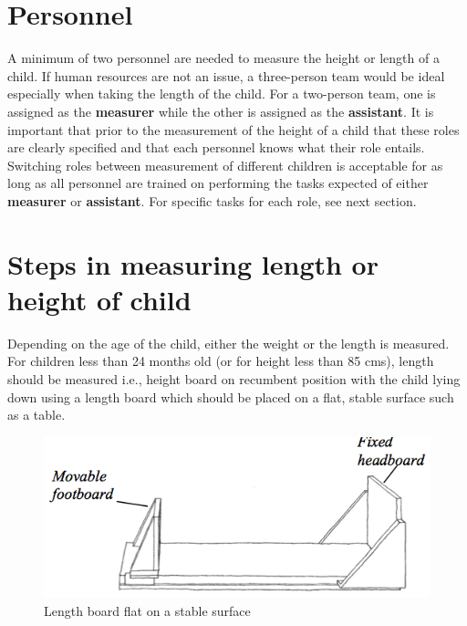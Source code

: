 \documentclass[12pt,]{book}
\theoremstyle{definition}
\theoremstyle{definition}
\theoremstyle{definition}
\theoremstyle{remark}
\begin{document}
\hypertarget{personnel-1}{%
\section{Personnel}\label{personnel-1}}

A minimum of two personnel are needed to measure the height or length of
a child. If human resources are not an issue, a three-person team would
be ideal especially when taking the length of the child. For a
two-person team, one is assigned as the \textbf{measurer} while the
other is assigned as the \textbf{assistant}. It is important that prior
to the measurement of the height of a child that these roles are clearly
specified and that each personnel knows what their role entails.
Switching roles between measurement of different children is acceptable
for as long as all personnel are trained on performing the tasks
expected of either \textbf{measurer} or \textbf{assistant}. For specific
tasks for each role, see next section.

\hypertarget{steps-in-measuring-length-or-height-of-child}{%
\section{Steps in measuring length or height of
child}\label{steps-in-measuring-length-or-height-of-child}}

Depending on the age of the child, either the weight or the length is
measured. For children less than 24 months old (or for height less than
85 cms), length should be measured i.e., height board on recumbent
position with the child lying down using a length board which should be
placed on a flat, stable surface such as a table.

\begin{figure}

{\centering \includegraphics[width=7.28in]{images/heightBoard03} 

}

\caption{Length board flat on a stable surface}\label{fig:height04}
\end{figure}
\end{document}
